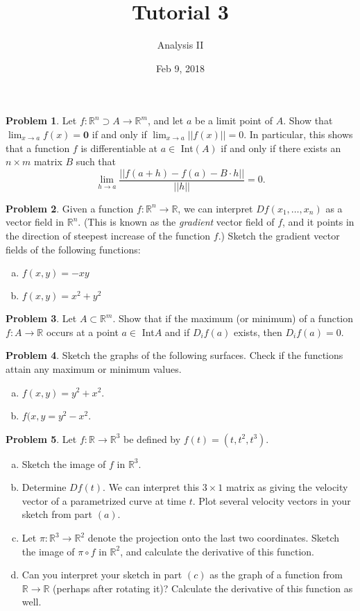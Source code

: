 \documentclass{amsart}
\newcommand{\+}[1]{\ensuremath{\mathbf{#1}}}
\newcommand{\R}{{\mathbb R}}
\theoremstyle{definition}
\newtheorem{prob}{Problem}
\begin{document}
\title{Tutorial 3}
\date{Feb 9, 2018}
\author{Analysis II}

\maketitle

\begin{prob}
Let $f:\R^n \supset A \to \R^m$, and let $a$ be a limit point of $A$.
Show that $\lim_{x \to a} f(x) = \+0$ if and only if $\lim_{x \to a} || f(x) || = 0$.
In particular, this shows that a function $f$ is differentiable at $a \in$ Int$(A)$
if and only if there exists an $n \times m$ matrix $B$ such that
\[
\lim_{h \to a} \frac{||f(a+h) - f(a) - B \cdot h ||}{|| h ||} = 0.
\]
\end{prob}

\begin{prob}
Given a function $f: \R^n \to \R$, we
can interpret $Df(x_1,\ldots,x_n)$ as a vector
field in $\R^n$.  (This is known as
the \emph{gradient} vector field of $f$, and it
points in the direction of steepest increase
of the function $f$.)
Sketch the gradient vector fields of the following
functions:
\begin{enumerate}[(a)]
 \item $f(x,y) = -xy$
 \item $f(x,y) = x^2 + y^2$
\end{enumerate}
\end{prob}


\begin{prob}
Let $A \subset \R^m$.
Show that if the maximum (or minimum) of a function $f: A \to \R$ occurs at a point $a \in $ Int$A$ and
if $D_i f(a)$ exists, then $D_if(a) = 0$.
\end{prob}

\begin{prob}
 Sketch the graphs of the following surfaces.  Check if the functions attain any maximum or
 minimum values.
 \begin{enumerate}[(a)]
  \item $f(x,y) = y^2 + x^2$.
  \item $f(x,y = y^2 - x^2$.
 \end{enumerate}
\end{prob}

\begin{prob}
Let $f: \R \to \R^3$ be defined by $f(t) = (t, t^2, t^3)$.
\begin{enumerate}[(a)]
 \item Sketch the image of $f$ in $\R^3$.
 \item Determine $Df(t)$.  We can interpret this $3 \times 1$ matrix
 as giving the velocity vector of a parametrized curve at time $t$.
 Plot several velocity vectors in your sketch from part $(a)$.
 \item Let $\pi: \R^3 \to \R^2$ denote the projection onto the last two coordinates.
 Sketch the image of $\pi \circ f$ in $\R^2$, and calculate the derivative of this function.
 \item Can you interpret your sketch in part $(c)$ as the graph of a function from $\R \to \R$ 
 (perhaps after rotating it)?  Calculate the derivative of this function as well.
\end{enumerate}
\end{prob}
\end{document}
